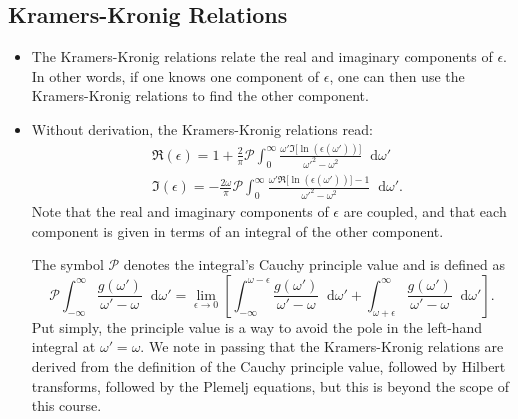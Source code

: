 \documentclass[11pt, a4paper]{article}
\newcommand{\diff}{\mathop{}\!\mathrm{d}} %
\begin{document}
\subsection{Kramers-Kronig Relations}
\begin{itemize}
    \item The Kramers-Kronig relations relate the real and imaginary components of $ \epsilon $. In other words, if one knows one component of $ \epsilon $, one can then use the Kramers-Kronig relations to find the other component.

    \item Without derivation, the Kramers-Kronig relations read:
    \begin{align*}
        & \Re(\epsilon) = 1 + \frac{2}{\pi} \mathcal{P} \int_{0}^{\infty} \frac{\omega' \Im \big[ \ln(\epsilon(\omega')) \big]}{\omega'^{2} - \omega^{2}} \diff \omega'\\
        & \Im(\epsilon) = - \frac{2\omega}{\pi} \mathcal{P} \int_{0}^{\infty} \frac{\omega' \Re \big[ \ln(\epsilon(\omega'))  \big]- 1}{\omega'^{2} - \omega^{2}} \diff \omega'.
    \end{align*}
    Note that the real and imaginary components of $ \epsilon $ are coupled, and that each component is given in terms of an integral of the other component.

    The symbol $ \mathcal{P} $ denotes the integral's Cauchy principle value and is defined as 
    \begin{equation*}
        \mathcal{P}\int_{-\infty}^{\infty} \frac{g(\omega')}{\omega' - \omega} \diff \omega' = \lim_{\epsilon \to 0} \left[ \int_{-\infty}^{\omega-\epsilon} \frac{g(\omega')}{\omega'-\omega}\diff \omega' + \int_{\omega+\epsilon}^{\infty} \frac{g(\omega')}{\omega'-\omega}\diff \omega' \right].
    \end{equation*}
    Put simply, the principle value is a way to avoid the pole in the left-hand integral at $ \omega' = \omega $. We note in passing that the Kramers-Kronig relations are derived from the definition of the Cauchy principle value, followed by Hilbert transforms, followed by the Plemelj equations, but this is beyond the scope of this course.

\end{itemize}
\end{document}
